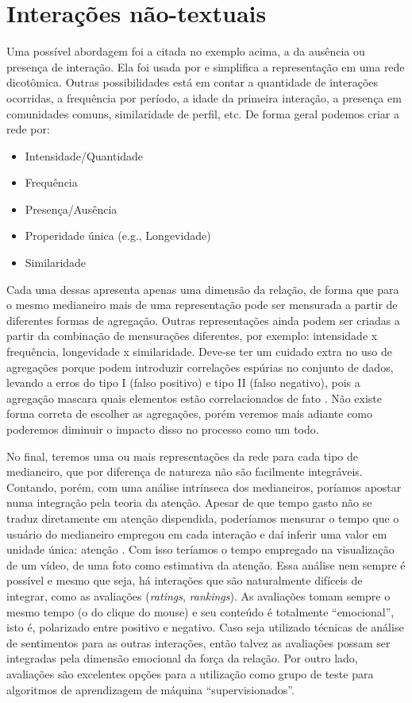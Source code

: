 \section{Interações não-textuais}

Uma possível abordagem foi a citada no exemplo acima, a da ausência ou presença
de interação. Ela foi usada por \citet{Xiang2010} e simplifica a representação
em uma rede dicotômica. Outras possibilidades está em contar a quantidade de
interações ocorridas, a frequência por período, a idade da primeira interação, a
presença em comunidades comuns, similaridade de perfil, etc. De forma geral
podemos criar a rede por:

\begin{itemize}
\item Intensidade/Quantidade
\item Frequência
\item Presença/Ausência
\item Properidade única (e.g., Longevidade)
\item Similaridade
\end{itemize}

Cada uma dessas apresenta apenas uma dimensão da relação, de forma que para o
mesmo medianeiro mais de uma representação pode ser mensurada a partir de
diferentes formas de agregação. Outras representações ainda podem ser criadas a
partir da combinação de mensurações diferentes, por exemplo: intensidade x
frequência, longevidade x similaridade. Deve-se ter um cuidado extra no uso de
agregações porque podem introduzir correlações espúrias no conjunto de dados,
levando a erros do tipo I (falso positivo) e tipo II (falso negativo), pois a
agregação mascara quais elementos estão correlacionados de fato
\citep{Jensen2003}. Não existe forma correta de escolher as agregações, porém
veremos mais adiante como poderemos diminuir o impacto disso no processo como um
todo.

No final, teremos uma ou mais representações da rede para cada tipo de
medianeiro, que por diferença de natureza não são facilmente integráveis.
Contando, porém, com uma análise intrínseca dos medianeiros, poríamos apostar
numa integração pela teoria da atenção. Apesar de que tempo gasto não se traduz
diretamente em atenção dispendida, poderíamos mensurar o tempo que o usuário do
medianeiro empregou em cada interação e daí inferir uma valor em unidade única:
atenção \citep{Davenport2001}. Com isso teríamos o tempo empregado na
visualização de um vídeo, de uma foto como estimativa da atenção. Essa análise
nem sempre é possível e mesmo que seja, há interações que são naturalmente
difíceis de integrar, como as avaliações (\emph{ratings}, \emph{rankings}). As
avaliações tomam sempre o mesmo tempo (o do clique do mouse) e seu conteúdo é
totalmente ``emocional'', isto é, polarizado entre positivo e negativo. Caso seja
utilizado técnicas de análise de sentimentos para as outras interações, então
talvez as avaliações possam ser integradas pela dimensão emocional da força da
relação. Por outro lado, avaliações são excelentes opções para a utilização como
grupo de teste para algoritmos de aprendizagem de máquina ``supervisionados''.

